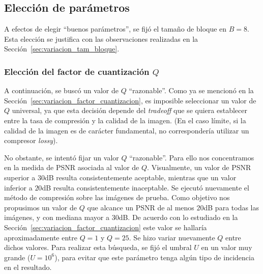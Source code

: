 \documentclass{article}
\begin{document}
\subsection{Elección de parámetros}

A efectos de elegir ``buenos parámetros'', se fijó
el tamaño de bloque en $B = 8$. Esta elección se justifica con las
observaciones realizadas en la Sección~\ref{sec:variacion_tam_bloque}.

\subsubsection{Elección del factor de cuantización $Q$}

A continuación, se buscó un valor de $Q$ ``razonable''.
Como ya se mencionó en la Sección~\ref{sec:variacion_factor_cuantizacion},
es imposible seleccionar un valor de $Q$ universal, ya que esta
decisión depende del {\em tradeoff} que se quiera establecer entre
la tasa de compresión y la calidad de la imagen.
(En el caso límite, si la calidad de la imagen es de carácter fundamental,
no correspondería utilizar un compresor {\em lossy}).

No obstante, se intentó fijar un valor $Q$ ``razonable''.
Para ello nos concentramos en la medida de PSNR asociada al valor de $Q$.
Visualmente, un valor de PSNR superior a $30$dB resulta consistentemente aceptable,
mientras que un valor inferior a $20$dB resulta consistentemente inaceptable.
Se ejecutó nuevamente el método de compresión sobre las imágenes de prueba.
Como objetivo nos propusimos un valor de $Q$ que alcance un PSNR de al menos $20$dB
para todas las imágenes, y con mediana mayor a $30$dB.
De acuerdo con lo estudiado en la
Sección~\ref{sec:variacion_factor_cuantizacion}
este valor se hallaría aproximadamente entre $Q = 1$ y $Q = 25$.
Se hizo variar nuevamente $Q$ entre dichos valores.
Para realizar esta búsqueda, se fijó el umbral $U$ en un valor
muy grande ($U = 10^6$),
para evitar que este parámetro tenga algún tipo de incidencia en el resultado.
\end{document}
